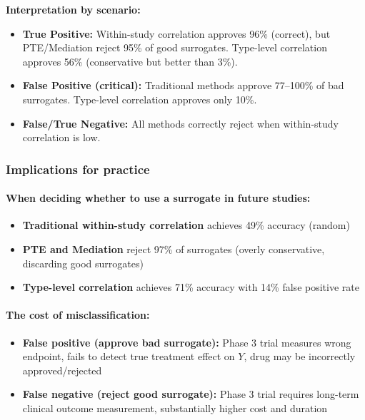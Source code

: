 \textbf{Interpretation by scenario:}
\begin{itemize}
    \item \textbf{True Positive:} Within-study correlation approves 96\% (correct), but PTE/Mediation reject 95\% of good surrogates. Type-level correlation approves 56\% (conservative but better than 3\%).

    \item \textbf{False Positive (critical):} Traditional methods approve 77--100\% of bad surrogates. Type-level correlation approves only 10\%.

    \item \textbf{False/True Negative:} All methods correctly reject when within-study correlation is low.
\end{itemize}

\subsubsection{Implications for practice}

\paragraph{When deciding whether to use a surrogate in future studies:}
\begin{itemize}
    \item \textbf{Traditional within-study correlation} achieves 49\% accuracy (random)
    \item \textbf{PTE and Mediation} reject 97\% of surrogates (overly conservative, discarding good surrogates)
    \item \textbf{Type-level correlation} achieves 71\% accuracy with 14\% false positive rate
\end{itemize}

\paragraph{The cost of misclassification:}
\begin{itemize}
    \item \textbf{False positive (approve bad surrogate):} Phase 3 trial measures wrong endpoint, fails to detect true treatment effect on $Y$, drug may be incorrectly approved/rejected
    \item \textbf{False negative (reject good surrogate):} Phase 3 trial requires long-term clinical outcome measurement, substantially higher cost and duration
\end{itemize}

